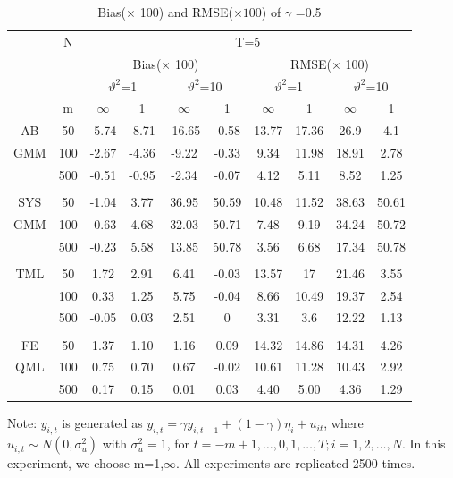 \documentclass[12pt,a4paper,hyperref]{article}
\begin{document}
\begin{center}
\begin{table}[H]
\caption{Bias($\times$ 100) and RMSE($\times 100$) of $\gamma$ =0.5} \label{table1}
\centering
\begin{tabular} {*{10}{c}}
\toprule
&N& \multicolumn{8}{c}{T=5}\\
\cmidrule(lr){3-10}
&& \multicolumn{4}{c}{Bias($\times$ 100)} & \multicolumn{4}{c}{RMSE($\times$ 100)}\\
  \cmidrule(lr){3-6} \cmidrule(lr){7-10}
&&  \multicolumn{2}{c}{$\vartheta^{2}$=1}&\multicolumn{2}{c}{$\vartheta^{2}$=10} & \multicolumn{2}{c}{$\vartheta^{2}$=1}&\multicolumn{2}{c}{$\vartheta^{2}$=10}\\
\cmidrule(lr){3-4} \cmidrule(lr){5-6}\cmidrule(lr){7-8}\cmidrule(lr){9-10}
& m & $\infty$ &1&$\infty$ &1&$\infty$ &1&$\infty$&1\\
\cmidrule(lr){3-4} \cmidrule(lr){5-6}\cmidrule(lr){7-8}\cmidrule(lr){9-10}
AB &50&	-5.74&-8.71	&-16.65	&-0.58	&13.77&17.36&26.9	&4.1\\
GMM&100&-2.67&  -4.36 &-9.22 &-0.33 & 9.34 & 11.98& 18.91&2.78 \\
&500&-0.51&-0.95&-2.34	&-0.07&4.12&5.11&8.52&1.25 \\
\midrule \\
\cmidrule(lr){3-4} \cmidrule(lr){5-6}\cmidrule(lr){7-8}\cmidrule(lr){9-10}
SYS &50& -1.04	&3.77&36.95&	50.59&10.48&11.52&38.63	&50.61\\
GMM &100& -0.63&4.68&32.03&	50.71&7.48&9.19&34.24&50.72 \\
 &500&-0.23	&5.58&13.85&50.78&3.56&6.68&17.34&50.78\\
 \midrule \\
\cmidrule(lr){3-4} \cmidrule(lr){5-6}\cmidrule(lr){7-8}\cmidrule(lr){9-10}
TML &50&1.72&	2.91	&	6.41&-0.03&	13.57	&17&21.46&3.55\\
 &100& 0.33 &1.25   & 5.75 & -0.04 & 8.66  &10.49   &19.37  & 2.54\\
 &500 &-0.05	&0.03&	2.51&0	&3.31&3.6&	12.22&	1.13\\
 \midrule \\
 \cmidrule(lr){3-4} \cmidrule(lr){5-6}\cmidrule(lr){7-8}\cmidrule(lr){9-10}
 FE& 50&1.37	&1.10	&1.16	&0.09&	14.32&	14.86	&14.31	&4.26
\\
 QML&100&0.75&	0.70	&0.67	&-0.02	&10.61	&11.28	&10.43	&2.92
\\
& 500&0.17	&0.15&	0.01&	0.03&	4.40&	5.00	&4.36	&1.29
\\
\bottomrule
\end{tabular}
\begin{tablenotes}
      \small
      \item Note: $y_{i,t}$ is generated as $y_{i,t}=\gamma y_{i,t-1}+(1-\gamma)\eta_{i}+u_{it}$, where $u_{i,t} \sim N\left(0, \sigma^{2}_{u} \right)$ with $\sigma^{2}_{u}=1$, for $t=-m+1,\ldots , 0, 1,\ldots, T; i=1,2,\ldots ,N$. In this experiment, we choose m=1,$\infty$.  All experiments are replicated 2500 times.
    \end{tablenotes}
\end{table}
\end{center}
\end{document}
